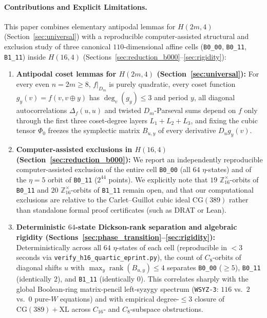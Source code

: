 \documentclass[11pt,a4paper]{article}
\theoremstyle{definition}
\newcommand{\Z}{\mathbb{Z}}
\newcommand{\rk}{\operatorname{rank}}
\begin{document}
\paragraph{Contributions and Explicit Limitations.}
This paper combines elementary antipodal lemmas for $H(2m,4)$ (Section~\ref{sec:universal}) with a reproducible computer-assisted structural and exclusion study of three canonical $110$-dimensional affine cells (\texttt{B0\_00}, \texttt{B0\_11}, \texttt{B1\_11}) inside $H(16,4)$ (Sections~\ref{sec:reduction_b000}--\ref{sec:rigidity}):
\begin{enumerate}
  \item \textbf{Antipodal coset lemmas for $H(2m,4)$ (Section~\ref{sec:universal}):} For every even $n = 2m \ge 8$, $f|_{D_m}$ is purely quadratic, every coset function $g_y(v) = f(v, v \oplus y)$ has $\deg_v(g_y) \le 3$ and period $y$, all diagonal autocorrelations $\Delta_f(u,u)$ and twisted $D_m$-Parseval sums depend on $f$ only through the first three coset-degree layers $L_1 + L_2 + L_3$, and fixing the cubic tensor $\Phi_0$ freezes the symplectic matrix $B_{u,y}$ of every derivative $D_u g_y(v)$.
  \item \textbf{Computer-assisted exclusions in $H(16,4)$ (Section~\ref{sec:reduction_b000}):} We report an independently reproducible computer-assisted exclusion of the entire cell \texttt{B0\_00} (all $64$ $\eta$-states) and of the $\eta=5$ orbit of \texttt{B0\_11} ($2^{44}$ points). We explicitly note that $19$ $\Z_{16}^\times$-orbits of \texttt{B0\_11} and $20$ $\Z_{16}^\times$-orbits of \texttt{B1\_11} remain open, and that our computational exclusions are relative to the Carlet--Guillot cubic ideal $\mathrm{CG}(389)$ rather than standalone formal proof certificates (such as DRAT or Lean).
  \item \textbf{Deterministic $64$-state Dickson-rank separation and algebraic rigidity (Sections~\ref{sec:phase_transition}--\ref{sec:rigidity}):} Deterministically across all $64$ $\eta$-states of each cell (reproducible in $<3$ seconds via \texttt{verify\_h16\_quartic\_eprint.py}), the count of $C_8$-orbits of diagonal shifts $u$ with $\max_y \rk(B_{u,y}) \le 4$ separates \texttt{B0\_00} ($\ge 5$), \texttt{B0\_11} (identically $2$), and \texttt{B1\_11} (identically $0$). This correlates sharply with the global Boolean-ring matrix-pencil left-syzygy spectrum (\texttt{WSYZ-3}: $116$ vs.\ $2$ vs.\ $0$ pure-$W$ equations) and with empirical degree-$\le 3$ closure of $\mathrm{CG}(389)+\mathrm{XL}$ across $C_{16}$- and $C_8$-subspace obstructions.
\end{enumerate}
\end{document}
